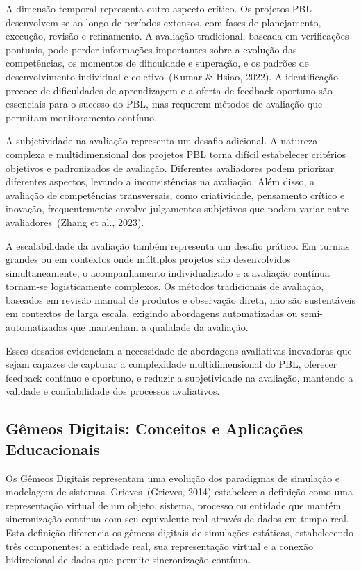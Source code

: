 \documentclass[english, spanish, brazilian]{modelo_dt}
\begin{document}
A dimensão temporal representa outro aspecto crítico. Os projetos PBL
desenvolvem-se ao longo de períodos extensos, com fases de planejamento,
execução, revisão e refinamento. A avaliação tradicional, baseada em
verificações pontuais, pode perder informações importantes sobre a evolução das
competências, os momentos de dificuldade e superação, e os padrões de
desenvolvimento individual e coletivo~(Kumar \& Hsiao, 2022). A identificação
precoce de dificuldades de aprendizagem e a oferta de feedback oportuno são
essenciais para o sucesso do PBL, mas requerem métodos de avaliação que
permitam monitoramento contínuo.

A subjetividade na avaliação representa um desafio adicional. A natureza
complexa e multidimensional dos projetos PBL torna difícil estabelecer
critérios objetivos e padronizados de avaliação. Diferentes avaliadores podem
priorizar diferentes aspectos, levando a inconsistências na avaliação. Além
disso, a avaliação de competências transversais, como criatividade, pensamento
crítico e inovação, frequentemente envolve julgamentos subjetivos que podem
variar entre avaliadores~(Zhang et al., 2023).

A escalabilidade da avaliação também representa um desafio prático. Em turmas
grandes ou em contextos onde múltiplos projetos são desenvolvidos
simultaneamente, o acompanhamento individualizado e a avaliação contínua
tornam-se logisticamente complexos. Os métodos tradicionais de avaliação,
baseados em revisão manual de produtos e observação direta, não são
sustentáveis em contextos de larga escala, exigindo abordagens automatizadas ou
semi-automatizadas que mantenham a qualidade da avaliação.

Esses desafios evidenciam a necessidade de abordagens avaliativas inovadoras
que sejam capazes de capturar a complexidade multidimensional do PBL, oferecer
feedback contínuo e oportuno, e reduzir a subjetividade na avaliação, mantendo
a validade e confiabilidade dos processos avaliativos.

\subsection{Gêmeos Digitais: Conceitos e Aplicações Educacionais}

Os Gêmeos Digitais representam uma evolução dos paradigmas de simulação e
modelagem de sistemas\@. Grieves\@~(Grieves, 2014) estabelece a definição como
uma representação virtual de um objeto, sistema, processo ou entidade que
mantém sincronização contínua com seu equivalente real através de dados em
tempo real\@. Esta definição diferencia os gêmeos digitais de simulações
estáticas, estabelecendo três componentes: a entidade real, sua representação
virtual e a conexão bidirecional de dados que permite sincronização contínua\@.
\end{document}
